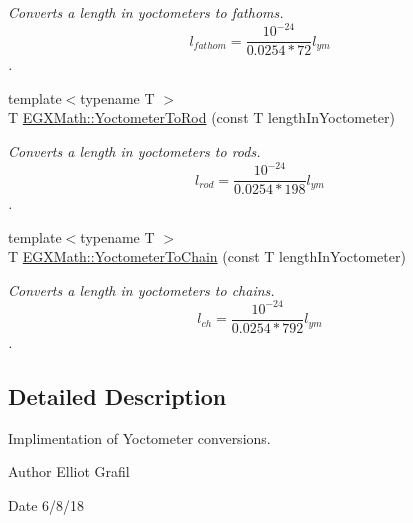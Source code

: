 \begin{DoxyCompactItemize}
\begin{DoxyCompactList}\small\item\em Converts a length in yoctometers to fathoms. \[ l_{fathom}= \frac{10^{-24}}{0.0254 * 72} l_{ym} \]. \end{DoxyCompactList}\item 
{\footnotesize template$<$typename T $>$ }\\T \mbox{\hyperlink{group___e_g_x_math-_conversions-_length_conversions-_s_i-_yoctometer-_surveyors_gaabe3a5aaa7081b0489d25f0b2117c11b}{E\+G\+X\+Math\+::\+Yoctometer\+To\+Rod}} (const T length\+In\+Yoctometer)
\begin{DoxyCompactList}\small\item\em Converts a length in yoctometers to rods. \[ l_{rod}= \frac{10^{-24}}{0.0254 * 198} l_{ym} \]. \end{DoxyCompactList}\item 
{\footnotesize template$<$typename T $>$ }\\T \mbox{\hyperlink{group___e_g_x_math-_conversions-_length_conversions-_s_i-_yoctometer-_surveyors_ga982ac95d1a3ac5e02e983e355af983d0}{E\+G\+X\+Math\+::\+Yoctometer\+To\+Chain}} (const T length\+In\+Yoctometer)
\begin{DoxyCompactList}\small\item\em Converts a length in yoctometers to chains. \[ l_{ch}= \frac{10^{-24}}{0.0254 * 792} l_{ym} \]. \end{DoxyCompactList}\end{DoxyCompactItemize}


\subsection{Detailed Description}
Implimentation of Yoctometer conversions. 

\begin{DoxyAuthor}{Author}
Elliot Grafil 
\end{DoxyAuthor}
\begin{DoxyDate}{Date}
6/8/18 
\end{DoxyDate}
